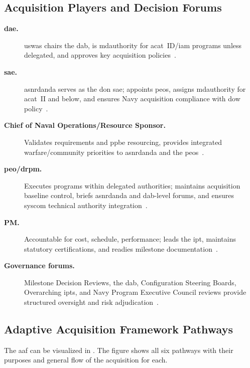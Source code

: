 \documentclass[../main.tex]{subfiles}
\begin{document}
\subsection{Acquisition Players and Decision Forums}
\begin{description}
\item[\textbf{\ac{dae}.}] \ac{uswas} chairs the \ac{dab}, is \ac{mdauthority} for \ac{acat}~ID/\ac{iam} programs unless delegated, and approves key acquisition policies~\autocite{DoDD5000-01,edo-3-3-1-acq-policy-players-2025}.
\item[\textbf{\ac{sae}.}] \ac{asnrdanda} serves as the \ac{don} \ac{sae}; appoints \acp{peo}, assigns \ac{mdauthority} for \ac{acat}~II and below, and ensures Navy acquisition compliance with \ac{dow} policy~\autocite{SECNAV5000-2G,SECNAV5400-15D}.
  \item[\textbf{Chief of Naval Operations/Resource Sponsor.}] Validates requirements and \ac{ppbe} resourcing, provides integrated warfare/community priorities to \ac{asnrdanda} and the \acp{peo}~\autocite{edo-3-3-1-acq-policy-players-2025}.
\item[\textbf{\ac{peo}/\ac{drpm}.}] Executes programs within delegated authorities; maintains acquisition baseline control, briefs \ac{asnrdanda} and \ac{dab}-level forums, and ensures \ac{syscom} technical authority integration~\autocite{SECNAV5400-15D,DoDI5000-85}.
  \item[\textbf{PM.}] Accountable for cost, schedule, performance; leads the \ac{ipt}, maintains statutory certifications, and readies milestone documentation~\autocite{DoDI5000-85,edo-3-3-1-acq-policy-players-2025}.
  \item[\textbf{Governance forums.}] Milestone Decision Reviews, the \ac{dab}, Configuration Steering Boards, Overarching \acp{ipt}, and Navy Program Executive Council reviews provide structured oversight and risk adjudication~\autocite{DoDD5000-01,DoDI5000-85,edo-3-3-1-acq-policy-players-2025}.
\end{description}

\subsection{Adaptive Acquisition Framework Pathways}
The \ac{aaf} can be visualized in \Fig{\ref{fig:aaf}}. The figure shows all six pathways with their purposes and general flow of the acquisition for each.
\end{document}
